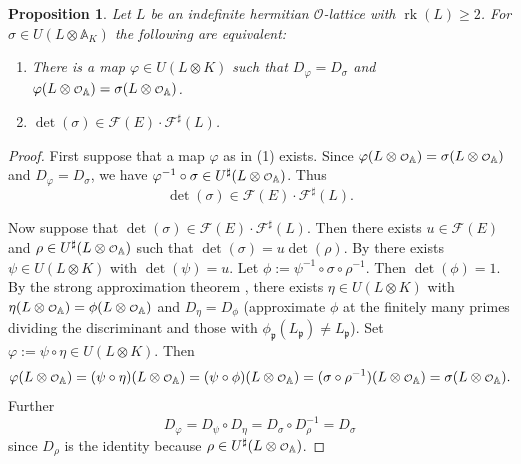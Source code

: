 \documentclass[a4paper]{amsart}
\theoremstyle{definition}
\theoremstyle{plain}
\newtheorem{proposition}[definition]{Proposition}
\DeclareMathOperator{\rk}{rk}
\renewcommand{\AA}{\mathbb{A}}
\renewcommand{\O}{\mathcal{O}}
\newcommand{\F}{\mathcal{F}}
\newcommand{\fp}{\mathfrak{p}}
\renewcommand\o{
  \mathchoice
    {{\scriptstyle\mathcal{O}}}%
    {{\scriptstyle\mathcal{O}}}%
    {{\scriptscriptstyle\mathcal{O}}}%
    {\scalebox{.7}{$\scriptscriptstyle\mathcal{O}$}}%
  }
\begin{document}
\begin{proposition}\label{kernel:global}
 Let $L$ be an indefinite hermitian $\O$-lattice with $\rk(L)\geq 2$.
  For $\sigma \in U(L\otimes \AA_K)$ the following are equivalent:
 \begin{enumerate}
   \item There is a map $\varphi \in U(L \otimes K)$ such that $D_\varphi=D_\sigma$ and $\varphi(L \otimes \o_{\AA})=\sigma(L\otimes \o_{\AA})$.
  \item $\det(\sigma) \in \F(E)\cdot \F^\sharp(L)$.
 \end{enumerate}
\end{proposition}
\begin{proof}
  First suppose that a map $\varphi$ as in (1) exists.
  Since $\varphi(L\otimes \o_{\AA})=\sigma(L\otimes \o_{\AA})$ and $D_\varphi = D_\sigma$, we have $\varphi^{-1} \circ \sigma \in U^\sharp(L\otimes \o_{\AA})$.
  Thus
\[\det(\sigma) \in\F(E)\cdot \F^\sharp(L).\]

Now suppose that $\det(\sigma) \in \F(E)\cdot \F^\sharp(L)$.
Then there exists $u \in \F(E)$ and $\rho \in U^\sharp(L \otimes {\o_{\AA}})$ such that
$\det(\sigma) = u \det(\rho)$. By  there exists $\psi \in U(L\otimes K)$ with $\det(\psi)=u$.
Let $\phi := \psi^{-1} \circ \sigma \circ \rho^{-1}$.
Then $\det(\phi)=1$.
By the strong approximation theorem \cite{kneser1966}, there exists
$\eta \in U(L\otimes K)$ with $\eta(L \otimes \o_{\AA})=\phi(L\otimes \o_{\AA})$ and $D_\eta = D_\phi$
(approximate $\phi$ at the finitely many primes dividing the discriminant and those with $\phi_\fp(L_\fp)\neq L_\fp$).
Set $\varphi := \psi \circ \eta \in U(L \otimes K)$.
Then
\[\varphi(L\otimes \o_{\AA}) = (\psi \circ \eta)(L\otimes \o_{\AA}) = (\psi \circ \phi)(L\otimes \o_{\AA}) = (\sigma \circ \rho^{-1})(L\otimes \o_{\AA})=\sigma(L\otimes \o_{\AA}).\]
  Further
\[D_{\varphi} =D_{\psi} \circ D_{\eta}= D_{\sigma} \circ D_{\rho}^{-1} = D_{\sigma}\]
since $D_{\rho}$ is the identity because $\rho\in U^\sharp(L \otimes \o_{\AA})$.
\end{proof}
\end{document}
